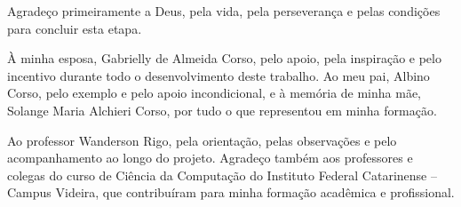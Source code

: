 \begin{agradecimentos}

Agradeço primeiramente a Deus, pela vida, pela perseverança e pelas condições para concluir esta etapa.

À minha esposa, Gabrielly de Almeida Corso, pelo apoio, pela inspiração e pelo incentivo durante todo o desenvolvimento deste trabalho. Ao meu pai, Albino Corso, pelo exemplo e pelo apoio incondicional, e à memória de minha mãe, Solange Maria Alchieri Corso, por tudo o que representou em minha formação.

Ao professor Wanderson Rigo, pela orientação, pelas observações e pelo acompanhamento ao longo do projeto. Agradeço também aos professores e colegas do curso de Ciência da Computação do Instituto Federal Catarinense -- Campus Videira, que contribuíram para minha formação acadêmica e profissional.

\end{agradecimentos}
